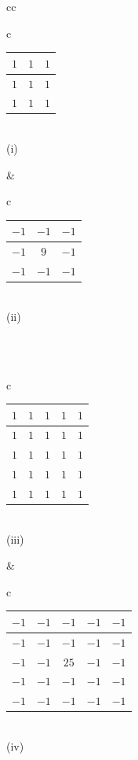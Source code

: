 \documentclass[journal,12pt,onecolumn]{IEEEtran}
\theoremstyle{remark}
\begin{document}
\begin{enumerate}
\begin{center}
\begin{tabular}{cc}


\begin{tabular}{c}
  \begin{tabular}{|c|c|c|}
  \hline
  $1$ & $1$ & $1$ \\
  \hline
  $1$ & $1$ & $1$ \\
  \hline
  $1$ & $1$ & $1$ \\
  \hline
  \end{tabular} \\
  (i)
\end{tabular} &


\begin{tabular}{c}
  \begin{tabular}{|c|c|c|}
  \hline
  $-1$ & $-1$ & $-1$ \\
  \hline
  $-1$ & $9$ & $-1$ \\
  \hline
  $-1$ & $-1$ & $-1$ \\
  \hline
  \end{tabular} \\
  (ii)
\end{tabular} \\

\\[5ex] 
\begin{tabular}{c}
  \begin{tabular}{|c|c|c|c|c|}
  \hline
  $1$ & $1$ & $1$ & $1$ & $1$ \\
  \hline
  $1$ & $1$ & $1$ & 
$1$ & $1$ \\
  \hline
  $1$ & $1$ & $1$ & $1$ & $1$ \\
  \hline
  $1$ & $1$ & $1$ & $1$ & $1$ \\
  \hline
  $1$ & $1$ & $1$ & $1$ & $1$ \\
  \hline
  \end{tabular} \\
  (iii)
\end{tabular} &


\begin{tabular}{c}
  \begin{tabular}{|c|c|c|c|c|}
  \hline
  $-1$ & $-1$ & $-1$ & $-1$ & $-1$ \\
  \hline
  $-1$ & $-1$ & $-1$ & $-1$ & $-1$ \\
  \hline
  $-1$ & $-1$ & $25$ & $-1$ & $-1$ \\
  \hline
  $-1$ & $-1$ & $-1$ 
& $-1$ & $-1$ \\
  \hline
  $-1$ & $-1$ & $-1$ & $-1$ & $-1$ \\
  \hline
  \end{tabular} \\
  (iv)
\end{tabular}


\end{tabular}
\end{center}
\end{enumerate}
\end{document}
